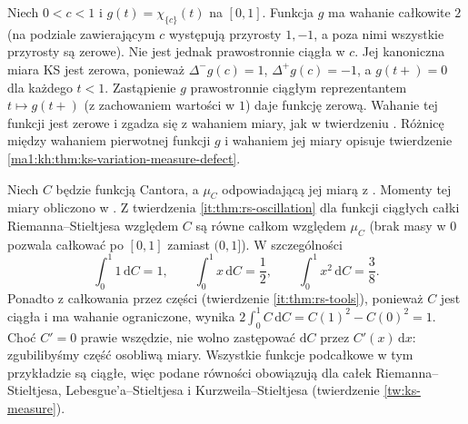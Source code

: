 \begin{przyklad}
\label{it:ex:stieltjes-signed-point}
Niech $0<c<1$ i $g(t)=\chi_{\{c\}}(t)$ na $[0,1]$.
Funkcja $g$ ma wahanie całkowite $2$ (na podziale
zawierającym $c$ występują przyrosty $1,-1$,
a poza nimi wszystkie przyrosty są zerowe).
Nie jest jednak prawostronnie ciągła w $c$.
Jej kanoniczna miara KS jest zerowa, ponieważ
$\Delta^-g(c)=1$, $\Delta^+g(c)=-1$,
a $g(t+)=0$ dla każdego $t<1$.
Zastąpienie $g$ prawostronnie ciągłym reprezentantem
$t\mapsto g(t+)$ (z zachowaniem wartości w $1$)
daje funkcję zerową. Wahanie tej funkcji jest zerowe
i zgadza się z wahaniem miary, jak w twierdzeniu
.
Różnicę między wahaniem pierwotnej funkcji $g$
i wahaniem jej miary opisuje twierdzenie
\ref{ma1:kh:thm:ks-variation-measure-defect}.
\end{przyklad}

\begin{przyklad}
Niech $C$ będzie funkcją Cantora, a $\mu_C$ odpowiadającą jej miarą z . Momenty tej miary obliczono w .
Z twierdzenia \ref{it:thm:rs-oscillation} dla funkcji
ciągłych całki Riemanna--Stieltjesa względem $C$
są równe całkom względem $\mu_C$ (brak masy w $0$
pozwala całkować po $[0,1]$ zamiast $(0,1]$).
W szczególności
\[
\int_0^1 1\,\mathrm dC=1,\qquad \int_0^1 x\,\mathrm dC=\frac12,\qquad \int_0^1 x^2\,\mathrm dC=\frac38.
\]
Ponadto z całkowania przez części (twierdzenie \ref{it:thm:rs-tools}), ponieważ $C$ jest ciągła i ma wahanie ograniczone, wynika $2\int_0^1 C\,\mathrm dC=C(1)^2-C(0)^2=1$. Choć $C'=0$ prawie wszędzie, nie wolno zastępować $\mathrm dC$ przez $C'(x)\,\mathrm dx$: zgubilibyśmy część osobliwą miary. Wszystkie funkcje podcałkowe w tym przykładzie są
ciągłe, więc podane równości obowiązują dla całek
Riemanna--Stieltjesa, Lebesgue'a--Stieltjesa i
Kurzweila--Stieltjesa (twierdzenie \ref{tw:ks-measure}).
\end{przyklad}

